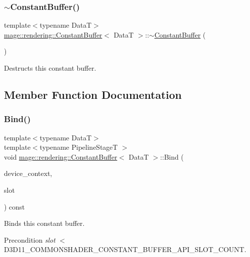 \subsubsection{\texorpdfstring{$\sim$\+Constant\+Buffer()}{~ConstantBuffer()}}
{\footnotesize\ttfamily template$<$typename DataT$>$ \\
\hyperlink{classmage_1_1rendering_1_1_constant_buffer}{mage\+::rendering\+::\+Constant\+Buffer}$<$ DataT $>$\+::$\sim$\hyperlink{classmage_1_1rendering_1_1_constant_buffer}{Constant\+Buffer} (\begin{DoxyParamCaption}{ }\end{DoxyParamCaption})\hspace{0.3cm}{\ttfamily [default]}}

Destructs this constant buffer. 

\subsection{Member Function Documentation}
\hypertarget{classmage_1_1rendering_1_1_constant_buffer_a810344fa71c98ee900f717351587a2f3}{}\label{classmage_1_1rendering_1_1_constant_buffer_a810344fa71c98ee900f717351587a2f3} 
\subsubsection{\texorpdfstring{Bind()}{Bind()}}
{\footnotesize\ttfamily template$<$typename DataT$>$ \\
template$<$typename Pipeline\+StageT $>$ \\
void \hyperlink{classmage_1_1rendering_1_1_constant_buffer}{mage\+::rendering\+::\+Constant\+Buffer}$<$ DataT $>$\+::Bind (\begin{DoxyParamCaption}\item[{I\+D3\+D11\+Device\+Context \&}]{device\+\_\+context,  }\item[{\hyperlink{namespacemage_a41c104c036fba3756a74e19f793eeaa1}{U32}}]{slot }\end{DoxyParamCaption}) const\hspace{0.3cm}{\ttfamily [noexcept]}}

Binds this constant buffer.

\begin{DoxyPrecond}{Precondition}
{\itshape slot} $<$ {\ttfamily D3\+D11\+\_\+\+C\+O\+M\+M\+O\+N\+S\+H\+A\+D\+E\+R\+\_\+\+C\+O\+N\+S\+T\+A\+N\+T\+\_\+\+B\+U\+F\+F\+E\+R\+\_\+\+A\+P\+I\+\_\+\+S\+L\+O\+T\+\_\+\+C\+O\+U\+NT}. 
\end{DoxyPrecond}

